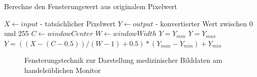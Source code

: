 \begin{algorithm}
\caption{Berechne den Fensterungswert aus originalem Pixelwert}
\begin{algorithmic}[1] 
\STATE $X \leftarrow input$ - tatsächlicher Pixelwert
\STATE $Y \leftarrow output$ - konvertierter Wert zwischen 0 und 255
\STATE $C \leftarrow windowCenter$
\STATE $W \leftarrow windowWidth$
	\STATE  $Y = Y_{min}$
	\STATE $Y = Y_{max}$
\ELSE
	\STATE $Y = ((X-(C-0.5)) / (W-1)+0.5)*(Y_{max}-Y_{min})+Y_{min}$
\ENDIF
\end{algorithmic}
\label{windowing_algo}
\end{algorithm}


\begin{figure}[htb]
\centering
{}
\caption{Fensterungstechnik zur Darstellung medizinischer Bilddaten am handelsüblichen Monitor \cite[S. 249]{handels:mbv}}
\label{window_sub}
\end{figure}


